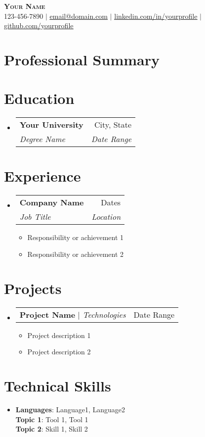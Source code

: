 \documentclass[letterpaper,11pt]{article}
\makeatletter
\newcommand{\resumeItem}[1]{
\item\small{
{#1 \vspace{-2pt}}
}
}
\newcommand{\resumeSubheading}[4]{
\vspace{-2pt}\item
\begin{tabular*}{0.97\textwidth}[t]{l@{\extracolsep{\fill}}r}
\textbf{#1} & #2 \\
\textit{\small#3} & \textit{\small #4} \\
\end{tabular*}\vspace{-7pt}
}
\newcommand{\resumeProjectHeading}[2]{
\item
\begin{tabular*}{0.97\textwidth}{l@{\extracolsep{\fill}}r}
\small#1 & #2 \\
\end{tabular*}\vspace{-7pt}
}
\newcommand{\resumeSubHeadingListStart}{\begin{itemize}[leftmargin=0.15in, label={}]}
\newcommand{\resumeSubHeadingListEnd}{\end{itemize}}
\newcommand{\resumeItemListStart}{\begin{itemize}}
\newcommand{\resumeItemListEnd}{\end{itemize}\vspace{-5pt}}
\makeatother
\begin{document}
\begin{center}
\textbf{\Huge \scshape Your Name} \\ \vspace{1pt}
\small 123-456-7890 $|$ \href{mailto:email@domain.com}{\underline{email@domain.com}} $|$
\href{https://linkedin.com/in/...}{\underline{linkedin.com/in/yourprofile}} $|$
\href{https://github.com/...}{\underline{github.com/yourprofile}}
\end{center}


\section{Professional Summary} %

\section{Education}
\resumeSubHeadingListStart
\resumeSubheading{Your University}{City, State}{Degree Name}{Date Range}
\resumeSubHeadingListEnd

\section{Experience}
\resumeSubHeadingListStart
\resumeSubheading{Company Name}{Dates}{Job Title}{Location}
\resumeItemListStart
\resumeItem{Responsibility or achievement 1}
\resumeItem{Responsibility or achievement 2}
\resumeItemListEnd
\resumeSubHeadingListEnd

\section{Projects}
\resumeSubHeadingListStart
\resumeProjectHeading{\textbf{Project Name} $|$ \emph{Technologies}}{Date Range}
\resumeItemListStart
\resumeItem{Project description 1}
\resumeItem{Project description 2}
\resumeItemListEnd
\resumeSubHeadingListEnd

\section{Technical Skills} %
\begin{itemize}[leftmargin=0.15in, label={}]
\item{
\textbf{Languages}{: Language1, Language2} \\
\textbf{Topic 1}{: Tool 1, Tool 1} \\
\textbf{Topic 2}{: Skill 1, Skill 2}
} \\
\end{itemize}


\end{document}
